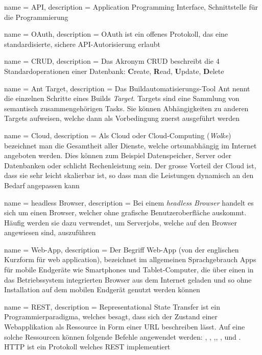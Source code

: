  {
	name = API,
	description = {Application Programming Interface, Schnittstelle für die Programmierung}
}

 {
	name = OAuth,
	description = {OAuth ist ein offenes Protokoll, das eine standardisierte, sichere API-Autorisierung erlaubt\cite{oauth}}
}

 {
	name = CRUD,
	description = {Das Akronym CRUD beschreibt die 4 Standardoperationen einer Datenbank: \textbf{C}reate, \textbf{R}ead, \textbf{U}pdate, \textbf{D}elete\cite{crud}}
}

 {
	name = Ant Target,
	description = {Das Buildautomatisierungs-Tool Ant nennt die einzelnen Schritte eines Builds \emph{Target}. Targets sind eine Sammlung von semantisch zusammengehörigen Tasks. Sie können Abhängigkeiten zu anderen Targets aufweisen, welche dann als Vorbedingung zuerst ausgeführt werden\cite{ant-target}}
}

 {
	name = Cloud,
	description = {Als Cloud oder Cloud-Computing (\emph{Wolke}) bezeichnet man die Gesamtheit aller Dienste, welche ortsunabhängig im Internet angeboten werden. Dies können zum Beispiel Datenspeicher, Server oder Datenbanken oder schlicht Rechenleistung sein. Der grosse Vorteil der Cloud ist, dass sie sehr leicht skalierbar ist, so dass man  die Leistungen dynamisch an den Bedarf angepassen kann\cite{cloud}}
}

 {
	name = headless Browser,
	description = {Bei einem \emph{headless Browser} handelt es sich um einen Browser, welcher ohne grafische Benutzeroberfläche auskommt. Häufig werden sie dazu verwendet, um Serverjobs, welche auf den Browser angewiesen sind, auszuführen}
}

 {
	name = Web-App,
	description = {Der Begriff Web-App (von der englischen Kurzform für web application), bezeichnet im allgemeinen Sprachgebrauch Apps für mobile Endgeräte wie Smartphones und Tablet-Computer, die über einen in das Betriebssystem integrierten Browser aus dem Internet geladen und so ohne Installation auf dem mobilen Endgerät genutzt werden können\cite{webapp}}
}

 {
	name = REST,
	description = {Representational State Transfer\cite{rest} ist ein Programmierparadigma, welches besagt, dass sich der Zustand einer Webapplikation als Ressource in Form einer URL beschreiben lässt. Auf eine solche Ressourcen können folgende Befehle angewendet werden: , , ,, ,  und .
	HTTP ist ein Protokoll welches REST implementiert}
}

